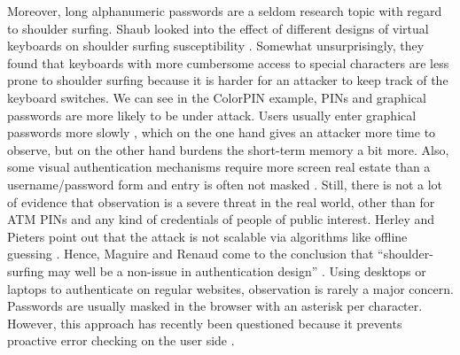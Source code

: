 Moreover, long alphanumeric passwords are a seldom research topic with regard to shoulder surfing. Shaub \etal looked into the effect of different designs of virtual keyboards on shoulder surfing susceptibility \cite{Schaub2012PasswordShoulderSurfing}. Somewhat unsurprisingly, they found that keyboards with more cumbersome access to special characters are less prone to shoulder surfing because it is harder for an attacker to keep track of the keyboard switches. We can see in the ColorPIN example, PINs and graphical passwords are more likely to be under attack. Users usually enter graphical passwords more slowly \cite{Tari2006ShoulderSurfingComparison, Wiedenbeck2006ConvexHull, Renaud2009VisualSnakeOil}, which on the one hand gives an attacker more time to observe, but on the other hand burdens the short-term memory a bit more. Also, some visual authentication mechanisms require more screen real estate than a username/password form and entry is often not masked \cite{Biddle2009GraphicalFirstTwelveYears}. Still, there is not a lot of evidence that observation is a severe threat in the real world, other than for ATM PINs and any kind of credentials of people of public interest. Herley and Pieters point out that the attack is not scalable via algorithms like offline guessing \cite{Herley2015Counterfactuals}. Hence, Maguire and Renaud come to the conclusion that ``shoulder-surfing may well be a non-issue in authentication design'' \cite{Maguire2012YouOnlyLiveTwice}. 
Using desktops or laptops to authenticate on regular websites, observation is rarely a major concern. Passwords are usually masked in the browser with an asterisk per character. However, this approach has recently been questioned because it prevents proactive error checking on the user side \cite{Sasse2016DebunkingMyths}. 

